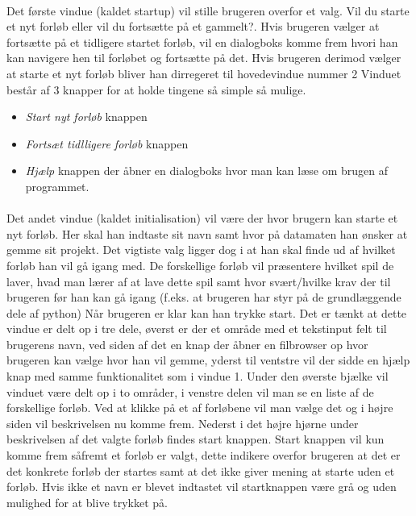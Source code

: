 \documentclass[10pt,a4paper,danish]{article}
\begin{document}
\paragraph{}
Det første vindue (kaldet startup) vil stille brugeren overfor et valg.
Vil du starte et nyt forløb eller vil du fortsætte på et gammelt?.
Hvis brugeren vælger at fortsætte på et tidligere startet forløb, vil en dialogboks komme frem hvori han kan navigere hen til forløbet og fortsætte på det.
Hvis brugeren derimod vælger at starte et nyt forløb bliver han dirregeret til hovedevindue nummer 2
Vinduet består af 3 knapper for at holde tingene så simple så mulige.
\begin{itemize}
\item \textit{Start nyt forløb} knappen
\item \textit{Fortsæt tidlligere forløb} knappen
\item \textit{Hjælp} knappen der åbner en dialogboks hvor man kan læse om brugen af programmet.
\end{itemize}

\paragraph{}
Det andet vindue (kaldet initialisation) vil være der hvor brugern kan starte et nyt forløb. Her skal han indtaste sit navn samt hvor på datamaten han ønsker at gemme sit projekt.
Det vigtiste valg ligger dog i at han skal finde ud af hvilket forløb han vil gå igang med. De forskellige forløb vil præsentere hvilket spil de laver, hvad man lærer af at lave dette spil samt hvor svært/hvilke krav der til brugeren før han kan gå igang (f.eks. at brugeren har styr på de grundlæggende dele af python)
Når brugeren er klar kan han trykke start.
Det er tænkt at dette vindue er delt op i tre dele, øverst er der et område med et tekstinput felt til brugerens navn, ved siden af det en knap der åbner en filbrowser op hvor brugeren kan vælge hvor han vil gemme, yderst til ventstre vil der sidde en hjælp knap med samme funktionalitet som i vindue 1.
Under den øverste bjælke vil vinduet være delt op i to områder, i venstre delen vil man se en liste af de forskellige forløb. Ved at klikke på et af forløbene vil man vælge det og i højre siden vil beskrivelsen nu komme frem. Nederst i det højre hjørne under beskrivelsen af det valgte forløb findes start knappen.
Start knappen vil kun komme frem såfremt et forløb er valgt, dette indikere overfor brugeren at det er det konkrete forløb der startes samt at det ikke giver mening at starte uden et forløb. Hvis ikke et navn er blevet indtastet vil startknappen være grå og uden mulighed for at blive trykket på.
\end{document}
